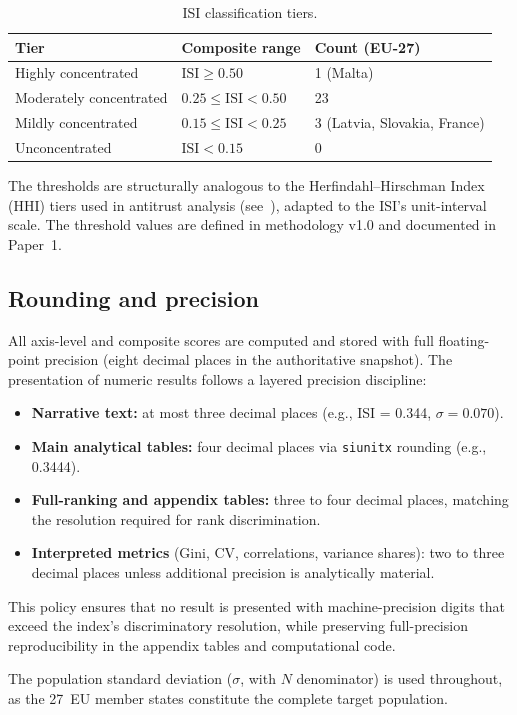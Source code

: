 \begin{table}[htbp]
\centering
\caption{ISI classification tiers.}
\label{tab:classification-tiers}
\begin{tabular}{@{}lll@{}}
\toprule
\textbf{Tier} & \textbf{Composite range} & \textbf{Count (EU-27)} \\
\midrule
Highly concentrated     & $\text{ISI} \geq 0.50$ & 1 (Malta) \\
Moderately concentrated & $0.25 \leq \text{ISI} < 0.50$ & 23 \\
Mildly concentrated     & $0.15 \leq \text{ISI} < 0.25$ & 3 (Latvia, Slovakia, France) \\
Unconcentrated          & $\text{ISI} < 0.15$ & 0 \\
\bottomrule
\end{tabular}
\end{table}

\noindent The thresholds are structurally analogous to the
Herfindahl--Hirschman Index (HHI) tiers used in antitrust analysis
(see~\cite{doj_hhi_2010}), adapted to the ISI's unit-interval scale.
The threshold values are defined in methodology v1.0 and documented
in Paper~1.

\subsection{Rounding and precision}\label{sec:rounding}

All axis-level and composite scores are computed and stored with full
floating-point precision (eight decimal places in the authoritative
snapshot).  The presentation of numeric results follows a layered
precision discipline:

\begin{itemize}[leftmargin=2em]
  \item \textbf{Narrative text:} at most three decimal places
    (e.g., ISI = 0.344, $\sigma = 0.070$).
  \item \textbf{Main analytical tables:} four decimal places via
    \texttt{siunitx} rounding (e.g., 0.3444).
  \item \textbf{Full-ranking and appendix tables:} three to four
    decimal places, matching the resolution required for
    rank discrimination.
  \item \textbf{Interpreted metrics} (Gini, CV, correlations,
    variance shares): two to three decimal places unless
    additional precision is analytically material.
\end{itemize}

\noindent This policy ensures that no result is presented with
machine-precision digits that exceed the index's discriminatory
resolution, while preserving full-precision reproducibility in the
appendix tables and computational code.

The population standard deviation ($\sigma$, with $N$ denominator)
is used throughout, as the 27~EU member states constitute the
complete target population.
